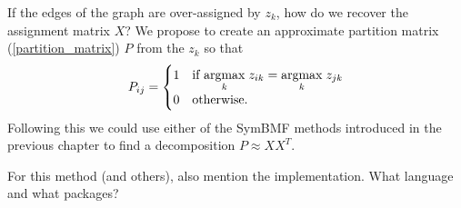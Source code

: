 If the edges of the graph are over-assigned by $z_k$, how do we recover
the assignment matrix $X$? We propose to create an approximate
partition matrix (\ref{partition_matrix}) $P$ from the $z_k$ so that
\[ P_{ij} = \begin{cases}
  1 & \text{if } \underset{k}{\mathrm{arg max}}\; z_{ik} = \underset{k}{\mathrm{arg max}}\; z_{jk} \\
  0 & \text{otherwise}.
\end{cases}\]
Following this we could use either of the SymBMF methods introduced
in the previous chapter to find a decomposition $P \approx X X^T$.

{\color{red}For this method (and others), also mention the implementation.
What language and what packages?}